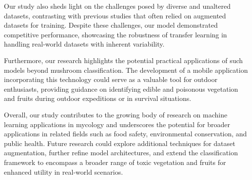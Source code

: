 Our study also sheds light on the challenges posed by diverse and unaltered datasets, contrasting with previous studies that often relied on augmented datasets for training. Despite these challenges, our model demonstrated competitive performance, showcasing the robustness of transfer learning in handling real-world datasets with inherent variability.


Furthermore, our research highlights the potential practical applications of such models beyond mushroom classification. The development of a mobile application incorporating this technology could serve as a valuable tool for outdoor enthusiasts, providing guidance on identifying edible and poisonous vegetation and fruits during outdoor expeditions or in survival situations.

Overall, our study contributes to the growing body of research on machine learning applications in mycology and underscores the potential for broader applications in related fields such as food safety, environmental conservation, and public health. Future research could explore additional techniques for dataset augmentation, further refine model architectures, and extend the classification framework to encompass a broader range of toxic vegetation and fruits for enhanced utility in real-world scenarios.